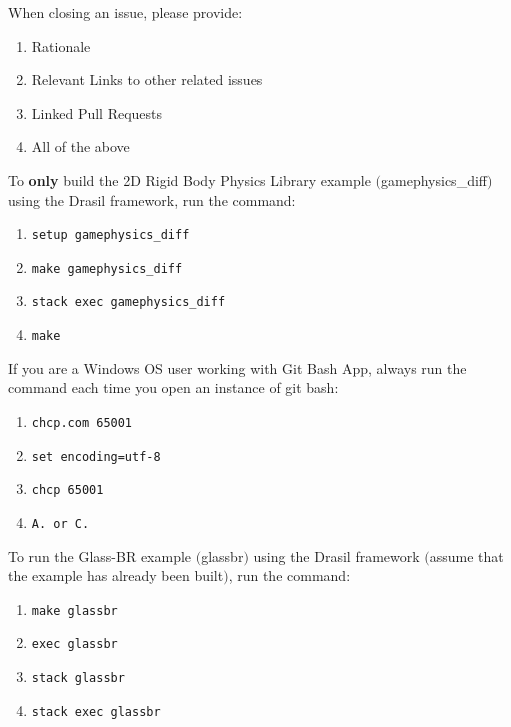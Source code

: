 \documentclass[12pt,fleqn]{examtst}
\begin{document}

\newpage
\noindent
\begin{minipage}{\textwidth}

When closing an issue, please provide:

\begin{enumerate}
    \item Rationale
    \item Relevant Links to other related issues
    \item Linked Pull Requests
    \item All of the above
\end{enumerate}

To \textbf{only} build the 2D Rigid Body Physics Library example $($gamephysics\_diff$)$ using the Drasil framework, run the command:

\begin{enumerate}
    \item \lstinline{setup gamephysics_diff}
    \item \lstinline{make gamephysics_diff}
    \item \lstinline{stack exec gamephysics_diff}
    \item \lstinline{make}
\end{enumerate}

If you are a Windows OS user working with Git Bash App, always run the command each time you open an instance of git bash:

\begin{enumerate}
    \item \lstinline{chcp.com 65001} 
    \item \lstinline{set encoding=utf-8}
    \item \lstinline{chcp 65001}
    \item \lstinline{A. or C.}
\end{enumerate}

To run the Glass-BR example $($glassbr$)$ using the Drasil framework $($assume that the example has already been built$)$, run the command:

\begin{enumerate}
    \item \lstinline{make glassbr}
    \item \lstinline{exec glassbr}
    \item \lstinline{stack glassbr}
    \item \lstinline{stack exec glassbr}
\end{enumerate}

\end{minipage}
\end{document}
